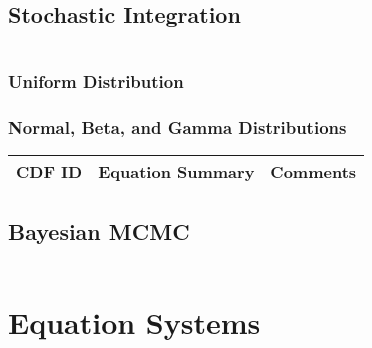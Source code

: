 \begin{equation}
\end{equation}

\subsection{Stochastic Integration}

\begin{equation}
\end{equation}

\subsubsection{Uniform Distribution}

\subsubsection{Normal, Beta, and Gamma Distributions}

\begin{table}[H]\centering
	\begin{tabular}{p{1cm}p{6cm}p{2cm}}
		CDF ID & Equation Summary & Comments\\
		\hline
		\hline
	\end{tabular}
\end{table}

\subsection{Bayesian MCMC}

\begin{equation}
\end{equation}

\section{Equation Systems}

